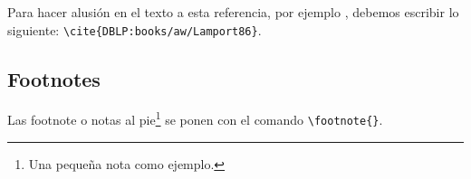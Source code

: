 \vspace{0.25 cm}

Para hacer alusión en el texto a esta referencia, por ejemplo \cite{DBLP:books/aw/Lamport86}, debemos escribir lo siguiente: \verb+\cite{DBLP:books/aw/Lamport86}+.

\subsection{Footnotes}
\label{subsecc:notas-al-pie}

Las footnote o notas al pie\footnote{Una peque\~{n}a nota como ejemplo.} se ponen con el comando \verb+\footnote{}+.























